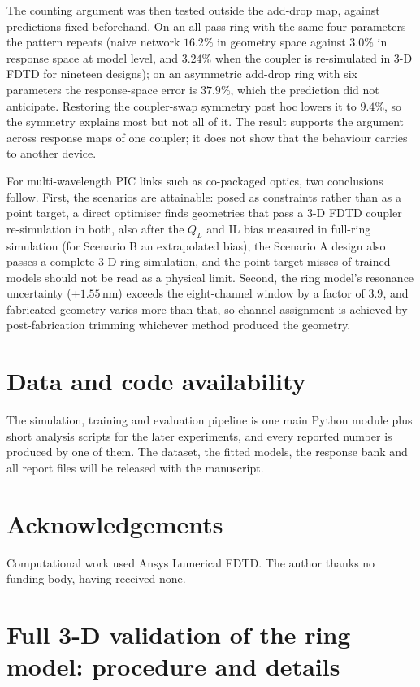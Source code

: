 \documentclass[11pt]{article}
\newcommand{\QL}{Q_L}
\begin{document}
The counting argument was then tested outside the add-drop map, against predictions fixed beforehand. On an all-pass ring with the same four parameters the pattern repeats (naive network $16.2\%$ in geometry space against $3.0\%$ in response space at model level, and $3.24\%$ when the coupler is re-simulated in 3-D FDTD for nineteen designs); on an asymmetric add-drop ring with six parameters the response-space error is $37.9\%$, which the prediction did not anticipate. Restoring the coupler-swap symmetry post hoc lowers it to $9.4\%$, so the symmetry explains most but not all of it. The result supports the argument across response maps of one coupler; it does not show that the behaviour carries to another device.\par\medskip\noindent For multi-wavelength PIC links such as co-packaged optics, two conclusions follow. First, the scenarios are attainable: posed as constraints rather than as a point target, a direct optimiser finds geometries that pass a 3-D FDTD coupler re-simulation in both, also after the $\QL$ and IL bias measured in full-ring simulation (for Scenario B an extrapolated bias), the Scenario A design also passes a complete 3-D ring simulation, and the point-target misses of trained models should not be read as a physical limit. Second, the ring model's resonance uncertainty ($\pm1.55$\,nm) exceeds the eight-channel window by a factor of $3.9$, and fabricated geometry varies more than that, so channel assignment is achieved by post-fabrication trimming whichever method produced the geometry.

\section*{Data and code availability}

The simulation, training and evaluation pipeline is one main Python module
plus short analysis scripts for the later experiments, and every reported number
is produced by one of them.
The dataset, the fitted models, the response bank and all report files will be
released with the manuscript.

\section*{Acknowledgements}

Computational work used Ansys Lumerical FDTD. The author thanks no funding
body, having received none.

\appendix
\section{Full 3-D validation of the ring model: procedure and details}
\label{sec:appring}
\end{document}
